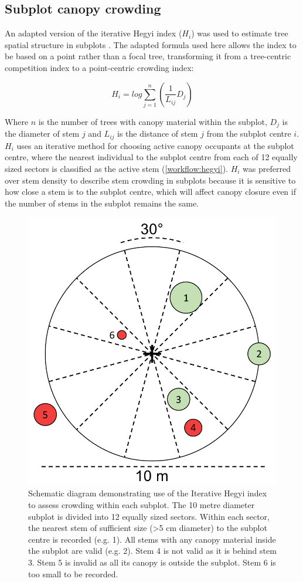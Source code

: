 \begin{refsection}
\subsection{Subplot canopy crowding}

An adapted version of the iterative Hegyi index ($H_{i}$) was used to estimate tree spatial structure in subplots \citep{Hegyi1974}. The adapted formula used here allows the index to be based on a point rather than a focal tree, transforming it from a tree-centric competition index to a point-centric crowding index:

\begin{equation}
	H_{i} = log\sum_{j=1}^{n} (\frac{1}{L_{ij}} D_{j})
\end{equation}

Where $n$ is the number of trees with canopy material within the subplot, $D_{j}$ is the diameter of stem $j$ and $L_{ij}$ is the distance of stem $j$ from the subplot centre $i$. $H_{i}$ uses an iterative method for choosing active canopy occupants at the subplot centre, where the nearest individual to the subplot centre from each of 12 equally sized sectors is classified as the active stem (\autoref{workflow:hegyi}). $H_{i}$ was preferred over stem density to describe stem crowding in subplots because it is sensitive to how close a stem is to the subplot centre, which will affect canopy closure even if the number of stems in the subplot remains the same. 

\begin{figure}
	\includegraphics[width=0.6\linewidth]{img/hegyi}
	\caption[Schematic diagram illustrating the iterative Hegyi index]{Schematic diagram demonstrating use of the Iterative Hegyi index to assess crowding within each subplot. The 10 metre diameter subplot is divided into 12 equally sized sectors. Within each sector, the nearest stem of sufficient size (>5 cm diameter) to the subplot centre is recorded (e.g. 1). All stems with any canopy material inside the subplot are valid (e.g. 2). Stem 4 is not valid as it is behind stem 3. Stem 5 is invalid as all its canopy is outside the subplot. Stem 6 is too small to be recorded.}
	\label{workflow:hegyi}
\end{figure}

\newpage{}
\FloatBarrier{}
\begingroup
{}
\printbibliography[heading=subbibintoc]
\endgroup

\end{refsection}

